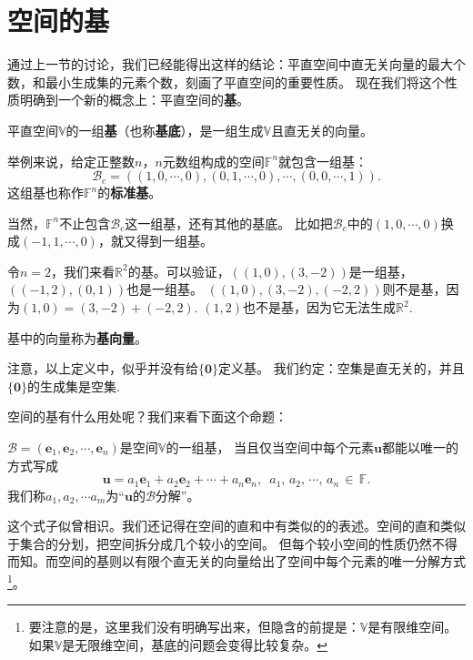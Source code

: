 \documentclass[12pt,UTF8]{ctexbook}
\begin{document}
\section{空间的基}
通过上一节的讨论，我们已经能得出这样的结论：平直空间中直无关向量的最大个数，和最小生成集的元素个数，刻画了平直空间的重要性质。
现在我们将这个性质明确到一个新的概念上：平直空间的{\bfseries 基}。

\begin{df}\label{df:2_3}
    平直空间$\mathbb{V}$的一组{\bfseries 基}（也称{\bfseries 基底}），是一组生成$\mathbb{V}$且直无关的向量。
\end{df}

举例来说，给定正整数$n$，$n$元数组构成的空间$\mathbb{F}^n$就包含一组基：
$$ \mathcal{B}_c = \left((1,0,\cdots,0),(0,1,\cdots,0),\cdots,(0,0,\cdots,1)\right).$$
这组基也称作$\mathbb{F}^n$的{\bfseries 标准基}。

当然，$\mathbb{F}^n$不止包含$\mathcal{B}_c$这一组基，还有其他的基底。
比如把$\mathcal{B}_c$中的$(1,0,\cdots,0)$换成$(-1,1,\cdots,0)$，就又得到一组基。

令$n = 2$，我们来看$\mathbb{R}^2$的基。可以验证，$\left((1,0),(3,-2)\right)$是一组基，$\left((-1,2),(0,1)\right)$也是一组基。
$\left((1,0),(3,-2),(-2,2)\right)$则不是基，因为$(1,0) = (3,-2) + (-2,2).$ 
$(1,2)$也不是基，因为它无法生成$\mathbb{R}^2.$

基中的向量称为\textbf{基向量}。

注意，以上定义中，似乎并没有给$\{\mathbf{0}\}$定义基。
我们约定：空集是直无关的，并且$\{\mathbf{0}\}$的生成集是空集.

空间的基有什么用处呢？我们来看下面这个命题：
\begin{pp}\label{pp:2_5}
    $ \mathcal{B} = (\mathbf{e}_1, \mathbf{e}_2, \cdots , \mathbf{e}_n )$是空间$\mathbb{V}$的一组基，
    当且仅当空间中每个元素$\mathbf{u}$都能以唯一的方式写成
    $$ \mathbf{u} = a_1\mathbf{e}_1 +a_2 \mathbf{e}_2 + \cdots + a_n\mathbf{e}_n, \,\,\, a_1,\,a_2,\,\cdots,\, a_n \,\in\,\mathbb{F}.$$
    我们称$a_1, a_2, \cdots a_m$为“$\mathbf{u}$的$\mathcal{B}$分解”。
\end{pp}
这个式子似曾相识。我们还记得在空间的直和中有类似的的表述。空间的直和类似于集合的分划，把空间拆分成几个较小的空间。
但每个较小空间的性质仍然不得而知。而空间的基则以有限个直无关的向量给出了空间中每个元素的唯一分解方式\footnote{要注意的是，这里我们没有明确写出来，但隐含的前提是：$\mathbb{V}$是有限维空间。如果$\mathbb{V}$是无限维空间，基底的问题会变得比较复杂。}。
\end{document}
